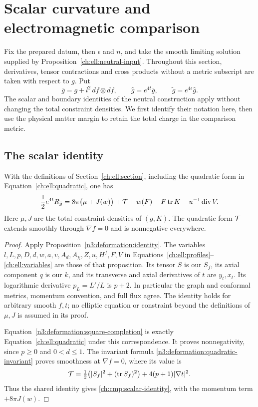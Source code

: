 \section{Scalar curvature and electromagnetic comparison}\label{ch:cmp:section}

Fix the prepared datum, then $\epsilon$ and $n$, and take the smooth limiting
solution supplied by Proposition~\ref{ch:ell:neutral-input}.
Throughout this section, derivatives, tensor contractions and cross products
without a metric subscript are taken with respect to $g$.  Put
\begin{equation}\label{ch:cmp:metrics}
 \bar g=g+l^2\,df\otimes df,\qquad
 \hat g=e^{4t}\bar g,\qquad
 \widetilde g=e^{4\epsilon}\hat g.
\end{equation}
The scalar and boundary identities of the neutral construction apply
without changing the total constraint densities. We first identify their
notation here, then use the physical matter margin to retain the total
charge in the comparison metric.

\subsection{The scalar identity}

\begin{lemma}\label{ch:cmp:scalar}
With the definitions of Section~\ref{ch:ell:section}, including the
quadratic form in Equation~\eqref{ch:ell:quadratic}, one has
\begin{equation}\label{ch:cmp:scalar-identity}
 \frac12 e^{4t}R_{\hat g}
 =8\pi\bigl(\mu+J(w)\bigr)+\mathcal T+w(F)-F\operatorname{tr} K
       -u^{-1}\operatorname{div} V.
\end{equation}
Here $\mu,J$ are the total constraint densities of $(g,K)$.
The quadratic form $\mathcal T$ extends smoothly through $\nabla f=0$ and is
nonnegative everywhere.
\end{lemma}

\begin{proof}
Apply Proposition~\ref{n3:deformation:identity}. The variables
$l,L,p,D,d,w,a,v,A_d,A_\chi,Z,u,H^f,F,V$ in
Equations~\eqref{ch:ell:profiles}--\eqref{ch:ell:variables} are those
of that proposition. Its tensor $S$ is our $S_f$, its axial component
$q$ is our $k$, and its transverse and axial derivatives of $t$ are
$y_t,x_t$. Its logarithmic derivative $p_L=L'/L$ is $p+2$.
In particular the graph and conformal metrics, momentum convention,
and full flux agree. The identity holds for arbitrary smooth $f,t$;
no elliptic equation or constraint beyond the definitions of $\mu,J$
is assumed in its proof.

Equation~\eqref{n3:deformation:square-completion} is exactly
Equation~\eqref{ch:ell:quadratic} under this correspondence. It proves
nonnegativity, since $p\ge0$ and $0<d\le1$. The invariant formula
\eqref{n3:deformation:quadratic-invariant} proves smoothness at
$\nabla f=0$, where its value is
\[
 \mathcal T=\tfrac12\bigl(|S_f|^2+(\operatorname{tr} S_f)^2\bigr)
                          +4(p+1)|\nabla t|^2.
\]
Thus the shared identity gives \eqref{ch:cmp:scalar-identity}, with
the momentum term $+8\pi J(w)$.
\end{proof}

